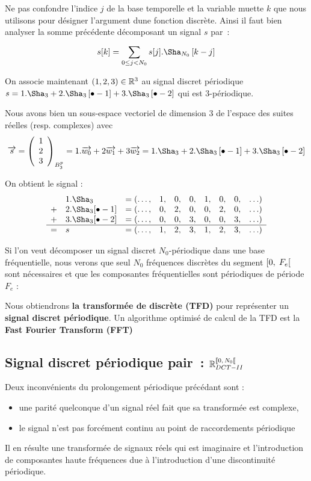 Ne pas confondre l'indice $j$ de la base temporelle et la variable
muette $k$ que nous utilisons pour désigner l'argument dune fonction
discrète. Ainsi il faut bien analyser la somme précédente décomposant
un signal $s$ par~:
\begin{equation}
  s[k] = \somme{0\leq j< N_0}{}{s[j].\Sha_{N_0}\b{k-j}}
\end{equation}

\begin{exemple}
  
  On associe maintenant $(1, 2, 3)\in\mathbb{R}^3$ au signal discret
  périodique
  $s=1.\Sha_{3}+2.\Sha_{3}\b{\bullet-1}+3.\Sha_{3}\b{\bullet-2}$ qui
  est 3-périodique.

  Nous avons bien un sous-espace vectoriel de dimension 3 de l'espace
  des suites réelles (resp. complexes) avec
  $$\vec{s} = \vvvectBase{1}{2}{3}{B_3^p} = 1.\vec{w_0}+2\vec{w_1}+3\vec{w_2} = 1.\Sha_{3}+2.\Sha_{3}\b{\bullet-1}+3.\Sha_{3}\b{\bullet-2}$$

  On obtient le signal :
  $$
  \begin{array}{llcccccccc}
    &1.\Sha_{3}            & =(\ldots, &1 , &0, &0, &1, &0, &0, &\ldots)\\
    +&2.\Sha_{3}[\bullet-1] & =(\ldots, &0 , &2, &0, &0, &2, &0, &\ldots)\\
    +&3.\Sha_{3}[\bullet-2] & =(\ldots, &0 , &0, &3, &0, &0, &3, &\ldots)\\\hline
    =& s  & =(\ldots, &1 , &2, &3, &1, &2, &3, &\ldots)
  \end{array}
  $$
\end{exemple}

\begin{remarque}
  Si l'on veut décomposer un signal discret $N_0$-périodique dans une
  base fréquentielle, nous verons que seul $N_0$ fréquences discrètes
  du segment $\left[0,\;F_e\right[$ sont nécessaires et que les composantes
  fréquentielles sont périodiques de période $F_e$ :


  Nous obtiendrons \textbf{la transformée de \Fourier{} discrète
    (TFD)} pour représenter un \textbf{signal discret périodique}. Un
  algorithme optimisé de calcul de la TFD est la \textbf{Fast Fourier
    Transform (FFT)}
\end{remarque}

\subsection{Signal discret périodique pair~: $\RNdctII$}
Deux inconvénients du prolongement périodique précédant sont :
\begin{itemize}
\item une parité quelconque d'un signal réel fait que sa transformée
  est complexe,
\item le signal n'est pas forcément continu au point de raccordements
  périodique
\end{itemize}
Il en résulte une transformée de signaux réels qui est imaginaire et
l'introduction de composantes haute fréquences due à l'introduction
d'une discontinuité périodique.

